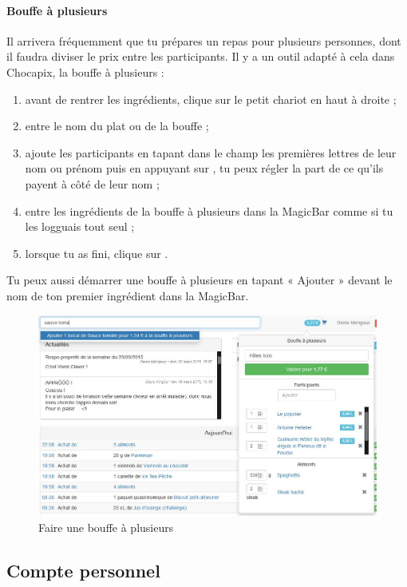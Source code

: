 \documentclass[12pt,french]{article}
\begin{document}
\paragraph{Bouffe à plusieurs} Il arrivera fréquemment que tu prépares un repas pour plusieurs personnes, dont il faudra diviser le prix entre les participants. Il y a un outil adapté à cela dans Chocapix, la bouffe à plusieurs :
\begin{enumerate}
	\item avant de rentrer les ingrédients, clique sur le petit chariot en haut à droite ;
	\item entre le nom du plat ou de la bouffe ;
	\item ajoute les participants en tapant dans le champ les premières lettres de leur nom ou prénom puis en appuyant sur , tu peux régler la part de ce qu'ils payent à côté de leur nom ;
	\item entre les ingrédients de la bouffe à plusieurs dans la MagicBar\texttrademark{} comme si tu les logguais tout seul ;
	\item lorsque tu as fini, clique sur .
\end{enumerate}
Tu peux aussi démarrer une bouffe à plusieurs en tapant « Ajouter » devant le nom de ton premier ingrédient dans la MagicBar\texttrademark{}.

\begin{figure}[h]
\centering
\includegraphics[width=16cm]{images/bouffeaplusieurs}
\caption{Faire une bouffe à plusieurs}
\end{figure}

\subsection{Compte personnel}
\end{document}
